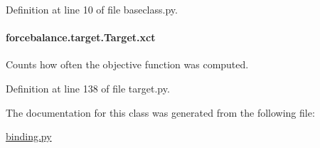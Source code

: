 Definition at line 10 of file baseclass.\-py.

\hypertarget{classforcebalance_1_1target_1_1Target_aad2e385cfbf7b4a68f1c2cb41133fe82}{
\paragraph[{xct}]{\setlength{\rightskip}{0pt plus 5cm}forcebalance.\-target.\-Target.\-xct\hspace{0.3cm}{\ttfamily [inherited]}}}\label{classforcebalance_1_1target_1_1Target_aad2e385cfbf7b4a68f1c2cb41133fe82}


Counts how often the objective function was computed. 



Definition at line 138 of file target.\-py.



The documentation for this class was generated from the following file\-:\begin{DoxyCompactItemize}
\item 
\hyperlink{binding_8py}{binding.\-py}\end{DoxyCompactItemize}
